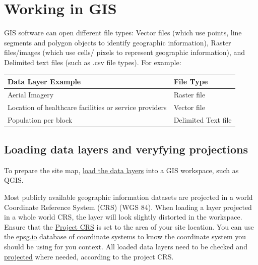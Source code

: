 \documentclass[
  a4paper,
  onecolumn,
  oneside]{book}
\begin{document}
\hypertarget{working-in-gis}{%
\section{Working in GIS}\label{working-in-gis}}

GIS software can open different file types: Vector files (which use
points, line segments and polygon objects to identify geographic
information), Raster files/images (which use cells/ pixels to represent
geographic information), and Delimited text files (such as .csv file
types). For example:

\begin{longtable}[]{@{}ll@{}}
\toprule()
Data Layer Example & File Type \\
\midrule()
\endhead
Aerial Imagery & Raster file \\
Location of healthcare facilities or service providers & Vector file \\
Population per block & Delimited Text file \\
\bottomrule()
\end{longtable}

\hypertarget{loading-data-layers-and-veryfying-projections}{%
\subsection{Loading data layers and veryfying
projections}\label{loading-data-layers-and-veryfying-projections}}

To prepare the site map,
\href{https://docs.qgis.org/2.8/en/docs/user_manual/working_with_vector/editing_geometry_attributes.html\#digitizing-an-existing-layer}{load
the data layers} into a GIS workspace, such as QGIS.

Most publicly available geographic information datasets are projected in
a world Coordinate Reference System (CRS) (WGS 84). When loading a layer
projected in a whole world CRS, the layer will look slightly distorted
in the workspace. Ensure that the
\href{https://docs.qgis.org/3.22/en/docs/user_manual/working_with_projections/working_with_projections.html\#project-coordinate-reference-systems}{Project
CRS} is set to the area of your site location. You can use the
\href{https://epsg.io/}{epsg.io} database of coordinate systems to know
the coordinate system you should be using for you context. All loaded
data layers need to be checked and
\href{https://docs.qgis.org/3.22/en/docs/user_manual/working_with_projections/working_with_projections.html\#layer-coordinate-reference-systems}{projected}
where needed, according to the project CRS.
\end{document}

